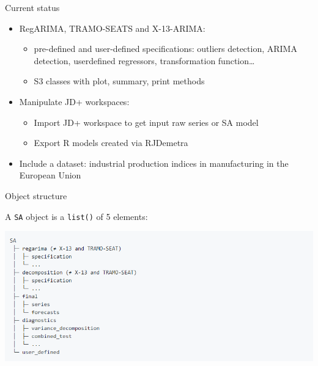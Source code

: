 \documentclass[10pt,xcolor=table,color={dvipsnames,usenames},ignorenonframetext,usepdftitle=false,french]{beamer}
\providecommand{\tightlist}{%
  \setlength{\parskip}{0pt}
  }
\begin{document}
\begin{frame}{Current status}
\protect\hypertarget{current-status-1}{}

\begin{itemize}
\tightlist
\item
  RegARIMA, TRAMO-SEATS and X-13-ARIMA:

  \begin{itemize}
  \tightlist
  \item
    pre-defined and user-defined specifications: outliers detection,
    ARIMA detection, userdefined regressors, transformation
    function\ldots{}\\
  \item
    S3 classes with plot, summary, print methods
  \end{itemize}
\end{itemize}

\medskip

\begin{itemize}
\tightlist
\item
  Manipulate JD+ workspaces:

  \begin{itemize}
  \tightlist
  \item
    Import JD+ workspace to get input raw series or SA model
  \item
    Export R models created via RJDemetra
  \end{itemize}
\end{itemize}

\medskip

\begin{itemize}
\tightlist
\item
  Include a dataset: industrial production indices in manufacturing in
  the European Union
\end{itemize}

\end{frame}

\begin{frame}[fragile]{Object structure}
\protect\hypertarget{object-structure}{}

A \texttt{SA} object is a \texttt{list()} of 5 elements:

\includegraphics{img/sa_obj_struct.png}

\end{frame}
\end{document}
